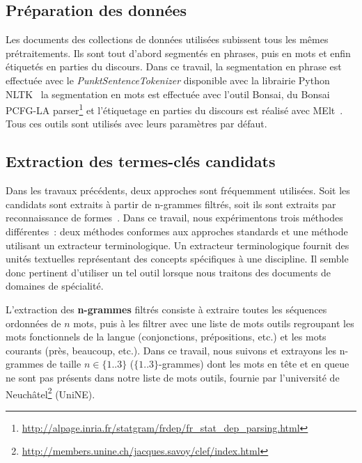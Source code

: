   \subsection{Préparation des données}
  \label{subsec:preparation_des_donnees}
    Les documents des collections de données utilisées subissent tous les mêmes
    prétraitements. Ils sont tout d'abord segmentés en phrases, puis en mots et
    enfin étiquetés en parties du discours. Dans ce travail, la segmentation en
    phrase est effectuée avec le \textit{PunktSentenceTokenizer} disponible avec
    la librairie Python
    NLTK~\cite[\textit{Natural Language ToolKit}]{bird2009nltk} la segmentation
    en mots est effectuée avec l'outil Bonsai, du Bonsai PCFG-LA
    parser\footnote{\url{http://alpage.inria.fr/statgram/frdep/fr_stat_dep_parsing.html}}
    et l'étiquetage en parties du discours est réalisé avec
    MElt~\cite{denis2009melt}. Tous ces outils sont utilisés avec leurs
    paramètres par défaut.

  \subsection{Extraction des termes-clés candidats}
  \label{subsec:extraction_de_termes_cles_candidats}
    Dans les travaux précédents, deux approches sont fréquemment utilisées. Soit
    les candidats sont extraits à partir de n-grammes filtrés, soit ils sont
    extraits par reconnaissance de formes~\cite{hulth2003keywordextraction}.
    Dans ce travail, nous expérimentons trois méthodes différentes~: deux
    méthodes conformes aux approches standards et une méthode utilisant un
    extracteur terminologique. Un extracteur terminologique fournit des unités
    textuelles représentant des concepts spécifiques à une discipline. Il semble
    donc pertinent d'utiliser un tel outil lorsque nous traitons des documents
    de domaines de spécialité.

    L'extraction des \textbf{n-grammes} filtrés consiste à extraire toutes les
    séquences ordonnées de $n$ mots, puis à les filtrer avec une liste de mots
    outils regroupant les mots fonctionnels de la langue (conjonctions,
    prépositions, etc.) et les mots courants (\og{}près\fg{},
    \og{}beaucoup\fg{}, etc.). Dans ce travail, nous suivons
     et extrayons les n-grammes de taille
    $n \in \{1..3\}$ ($\{1..3\}$-grammes) dont les mots en tête et en queue ne
    sont pas présents dans notre liste de mots outils, fournie par l'université
    de
    Neuchâtel\footnote{\url{http://members.unine.ch/jacques.savoy/clef/index.html}}
    (UniNE).
    
